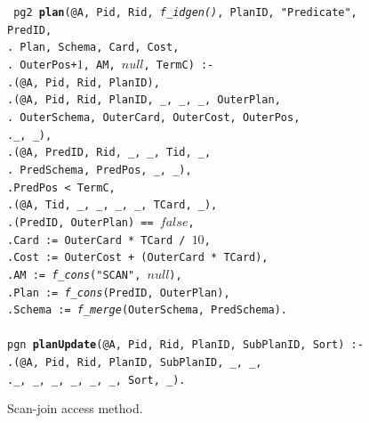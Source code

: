 \documentclass{sigmod08}
\newcommand{\datalogspace}{\textcolor[gray]{1}{.}\hspace{0.5in}}
\begin{document}
\begin{figure}
\centering
\begin{boxedminipage}{\linewidth}
\scriptsize{\tt
pg2 {\small \bf plan}(@A, Pid, Rid, {\em f\_idgen()}, PlanID, "Predicate", PredID, \\
\datalogspace \xspace Plan, Schema, Card, Cost, \\
\datalogspace \xspace OuterPos+$1$, AM, $null$, TermC) :-\\
\datalogspace {\small \bf bestPlanUpdate}(@A, Pid, Rid, PlanID),\\
\datalogspace {\small \bf plan}(@A, Pid, Rid, PlanID, \_, \_, \_, OuterPlan, \\
\datalogspace \xspace \xspace OuterSchema, OuterCard, OuterCost, OuterPos, \\
\datalogspace \xspace \xspace \_, \_),  \\   
\datalogspace {\small \bf predicate}(@A, PredID, Rid, \_, \_, Tid, \_, \\
\datalogspace \xspace \xspace PredSchema, PredPos, \_, \_),\\
\datalogspace PredPos < TermC,\\
\datalogspace {\small \bf table}(@A, Tid, \_, \_, \_, \_, TCard, \_),\\
\datalogspace {\em f\_contains}(PredID, OuterPlan) == $false$,\\
\datalogspace Card := OuterCard * TCard / $10$,\\
\datalogspace Cost := OuterCost + (OuterCard * TCard),\\
\datalogspace AM := {\em f\_cons}("SCAN", $null$), \\
\datalogspace Plan := {\em f\_cons}(PredID, OuterPlan), \\
\datalogspace Schema := {\em f\_merge}(OuterSchema, PredSchema).\\
\\
pgn {\small \bf planUpdate}(@A, Pid, Rid, PlanID, SubPlanID, Sort) :- \\
\datalogspace {\small \bf plan}(@A, Pid, Rid, PlanID, SubPlanID, \_, \_, \\
\datalogspace \xspace \xspace \_, \_, \_, \_, \_, \_, Sort, \_).
}
\caption{\label{fig:plangen1}Scan-join access method.}
\end{boxedminipage}
\end{figure}
\end{document}
